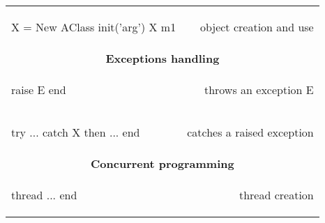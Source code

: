 \documentclass[12pt]{article}
\begin{document}
\begin{longtable}{l r}
\begin{oz}
X = {New AClass init('arg')}
{X m1}
\end{oz}
&object creation and use\\[0.4em]

\multicolumn{2}{c}{\textbf{Exceptions handling}}\\

\begin{oz}
raise E end
\end{oz}
&throws an exception E \\

\begin{oz}
try ... catch X then ... end
\end{oz}
&catches a raised exception\\[0.4em]


\multicolumn{2}{c}{\textbf{Concurrent programming}}\\

\begin{oz}
thread ... end
\end{oz}
&thread creation\\

\bottomrule
\end{longtable}
\end{document}
